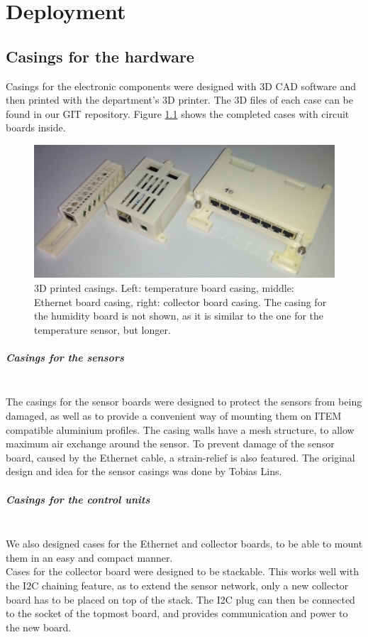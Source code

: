 \documentclass[a4paper]{scrreprt}
\begin{document}
\chapter{Deployment}
\section{Casings for the hardware}
Casings for the electronic components were designed with 3D CAD software and then printed with the department's 3D printer. The 3D
files of each case can be found in our GIT repository. Figure \ref{fig:casings} shows the completed cases with circuit boards inside.
\begin{figure}[Hh!]
	\centering
	\includegraphics[width=\textwidth]{img/cases.jpg}
  \caption{3D printed casings. Left: temperature board casing, middle: Ethernet board casing, right: collector board casing. The casing for the humidity board is not shown, as it is similar to the one for the temperature sensor, but longer.}
	\label{fig:casings}
\end{figure}
\paragraph{Casings for the sensors}\hspace{1cm}\\
The casings for the sensor boards were designed to protect the sensors from being damaged, as well as to provide a convenient way of
mounting them on ITEM compatible aluminium profiles. The casing walls have a mesh structure, to allow maximum air exchange around the
sensor. To prevent damage of the sensor board, caused by the Ethernet cable, a strain-relief is also featured. The original design and
idea for the sensor casings was done by Tobias Lins.
\paragraph{Casings for the control units}\hspace{1cm}\\
We also designed cases for the Ethernet and collector boards, to be able to mount them in an easy and compact manner.\\
Cases for the collector board were designed to be stackable. This works well with the I2C chaining feature, as to extend the sensor network,
only a new collector board has to be placed on top of the stack. The I2C plug can then be connected to the socket of the topmost board, and provides
communication and power to the new board.
\end{document}
